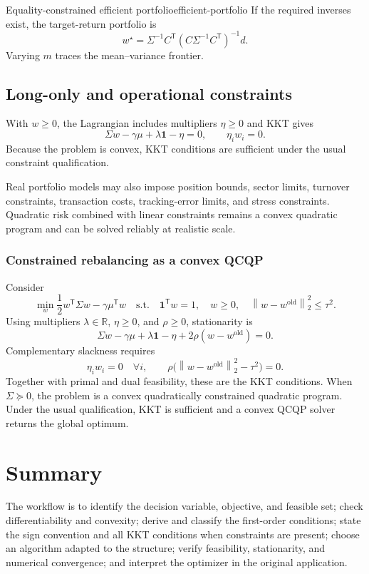 \documentclass[11pt]{article}
\newcommand{\R}{\mathbb{R}}
\newcommand{\trans}{^{\mathsf T}}
\newcommand{\norm}[1]{\left\lVert#1\right\rVert}
\theoremstyle{definition}
\theoremstyle{remark}
\begin{document}
\begin{keyproposition}{Equality-constrained efficient portfolio}{efficient-portfolio}
If the required inverses exist, the target-return portfolio is
\[
  \boxed{
  w^\star=\Sigma^{-1}C\trans
  (C\Sigma^{-1}C\trans)^{-1}d.}
\]
Varying $m$ traces the mean--variance frontier.
\end{keyproposition}

\subsection{Long-only and operational constraints}

With $w\geq0$, the Lagrangian includes multipliers $\eta\geq0$ and KKT gives
\[
  \Sigma w-\gamma\mu+\lambda\mathbf1-\eta=0,
  \qquad \eta_iw_i=0.
\]
Because the problem is convex, KKT conditions are sufficient under the usual
constraint qualification.

Real portfolio models may also impose position bounds, sector limits,
turnover constraints, transaction costs, tracking-error limits, and stress
constraints. Quadratic risk combined with linear constraints remains a convex
quadratic program and can be solved reliably at realistic scale.

\subsubsection*{Constrained rebalancing as a convex QCQP}

Consider
\[
\min_w\frac12w\trans\Sigma w-\gamma\mu\trans w
\quad\text{s.t.}\quad
\mathbf1\trans w=1,\quad w\geq0,\quad
\norm{w-w^{\mathrm{old}}}_2^2\leq\tau^2.
\]
Using multipliers $\lambda\in\R$, $\eta\geq0$, and $\rho\geq0$, stationarity is
\[
\boxed{
\Sigma w-\gamma\mu+\lambda\mathbf1-\eta
+2\rho(w-w^{\mathrm{old}})=0.}
\]
Complementary slackness requires
\[
\boxed{
\eta_iw_i=0\quad\forall i,
\qquad
\rho\bigl(\norm{w-w^{\mathrm{old}}}_2^2-\tau^2\bigr)=0.}
\]
Together with primal and dual feasibility, these are the KKT conditions. When
$\Sigma\succeq0$, the problem is a convex quadratically constrained quadratic
program. Under the usual qualification, KKT is sufficient and a convex QCQP
solver returns the global optimum.

\section{Summary}

The workflow is to identify the decision variable, objective, and feasible set;
check differentiability and convexity; derive and classify the first-order
conditions; state the sign convention and all KKT conditions when constraints
are present; choose an algorithm adapted to the structure; verify feasibility,
stationarity, and numerical convergence; and interpret the optimizer in the
original application.
\end{document}
